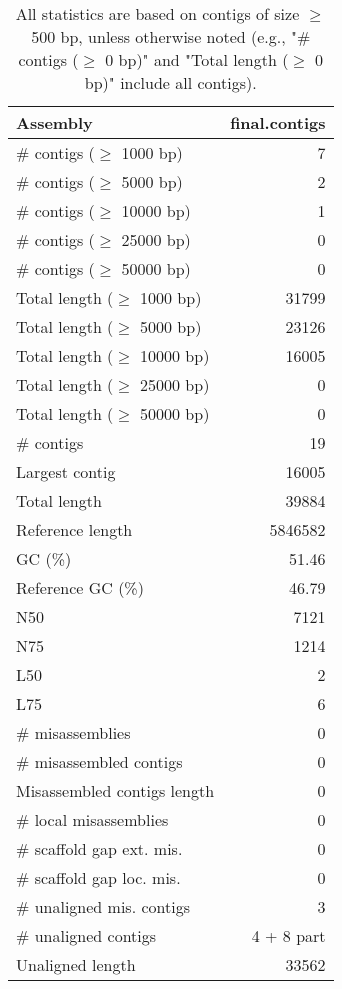 \documentclass[12pt,a4paper]{article}
\begin{document}
\begin{table}[ht]
\begin{center}
\caption{All statistics are based on contigs of size $\geq$ 500 bp, unless otherwise noted (e.g., "\# contigs ($\geq$ 0 bp)" and "Total length ($\geq$ 0 bp)" include all contigs).}
\begin{tabular}{|l*{1}{|r}|}
\hline
Assembly & final.contigs \\ \hline
\# contigs ($\geq$ 1000 bp) & 7 \\ \hline
\# contigs ($\geq$ 5000 bp) & 2 \\ \hline
\# contigs ($\geq$ 10000 bp) & 1 \\ \hline
\# contigs ($\geq$ 25000 bp) & 0 \\ \hline
\# contigs ($\geq$ 50000 bp) & 0 \\ \hline
Total length ($\geq$ 1000 bp) & 31799 \\ \hline
Total length ($\geq$ 5000 bp) & 23126 \\ \hline
Total length ($\geq$ 10000 bp) & 16005 \\ \hline
Total length ($\geq$ 25000 bp) & 0 \\ \hline
Total length ($\geq$ 50000 bp) & 0 \\ \hline
\# contigs & 19 \\ \hline
Largest contig & 16005 \\ \hline
Total length & 39884 \\ \hline
Reference length & 5846582 \\ \hline
GC (\%) & 51.46 \\ \hline
Reference GC (\%) & 46.79 \\ \hline
N50 & 7121 \\ \hline
N75 & 1214 \\ \hline
L50 & 2 \\ \hline
L75 & 6 \\ \hline
\# misassemblies & 0 \\ \hline
\# misassembled contigs & 0 \\ \hline
Misassembled contigs length & 0 \\ \hline
\# local misassemblies & 0 \\ \hline
\# scaffold gap ext. mis. & 0 \\ \hline
\# scaffold gap loc. mis. & 0 \\ \hline
\# unaligned mis. contigs & 3 \\ \hline
\# unaligned contigs & 4 + 8 part \\ \hline
Unaligned length & 33562 \\ \hline

\end{tabular}
\end{center}
\end{table}
\end{document}
